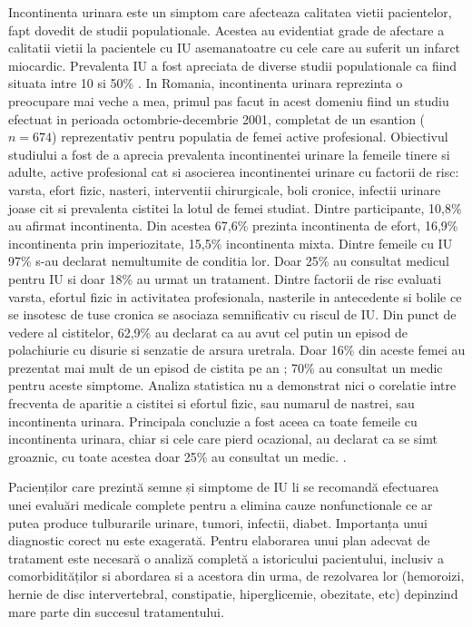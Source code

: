 \documentclass[12pt]{article}
\begin{document}
Incontinenta urinara este un simptom care afecteaza calitatea vietii pacientelor, fapt dovedit de studii populationale. Acestea au evidentiat grade de afectare a calitatii vietii la pacientele cu \ac{IU} asemanatoatre cu cele care au suferit un infarct miocardic. Prevalenta \ac{IU} a fost apreciata de diverse studii populationale ca fiind situata intre 10 si 50\% . 
In Romania, incontinenta urinara reprezinta o preocupare mai veche a mea, primul pas facut in acest domeniu fiind un studiu efectuat in perioada octombrie-decembrie 2001, completat de un esantion ($n=674$) reprezentativ pentru populatia de femei active profesional.
Obiectivul studiului a fost de a aprecia prevalenta incontinentei urinare la femeile tinere si adulte, active profesional cat si asocierea incontinentei urinare cu factorii de risc: varsta, efort fizic, nasteri, interventii chirurgicale, boli cronice, infectii urinare joase cit si prevalenta cistitei la lotul de femei studiat.
Dintre participante, 10,8\% au afirmat incontinenta. Din acestea 67,6\% prezinta incontinenta de efort, 16,9\% incontinenta prin imperiozitate, 15,5\% incontinenta mixta. 
Dintre femeile cu \ac{IU} 97\% s-au declarat nemultumite de conditia lor. Doar 25\% au consultat medicul pentru IU si doar 18\% au urmat un tratament. 
Dintre factorii de risc evaluati varsta, efortul fizic in activitatea profesionala, nasterile in antecedente si bolile ce se insotesc de tuse cronica se asociaza semnificativ cu riscul de IU. 
Din punct de vedere al cistitelor, 62,9\% au declarat ca au avut cel putin un episod de polachiurie cu disurie si senzatie de arsura uretrala.
Doar 16\% din aceste femei au prezentat mai mult de un episod de cistita pe an ; 70\% au consultat un medic pentru aceste simptome. 
Analiza statistica nu a demonstrat nici o corelatie intre frecventa de aparitie a cistitei si efortul fizic, sau numarul de nastrei, sau incontinenta urinara. 
Principala concluzie a fost aceea ca toate femeile cu incontinenta urinara, chiar si cele care pierd ocazional, au declarat ca se simt groaznic, cu toate acestea doar 25\% au consultat un medic. \citep{Manu04}.

Pacienților care prezintă semne și simptome de IU li se recomandă efectuarea unei evaluări medicale complete pentru a elimina cauze nonfunctionale ce ar putea produce tulburarile urinare, tumori, infectii, diabet. Importanța unui diagnostic corect nu este exagerată. 
Pentru elaborarea unui plan adecvat de tratament este necesară o analiză completă a istoricului pacientului, inclusiv a comorbidităților si abordarea si a acestora din urma, de rezolvarea lor (hemoroizi, hernie de disc intervertebral, constipatie, hiperglicemie, obezitate, etc) depinzind mare parte din succesul tratamentului.
\end{document}
